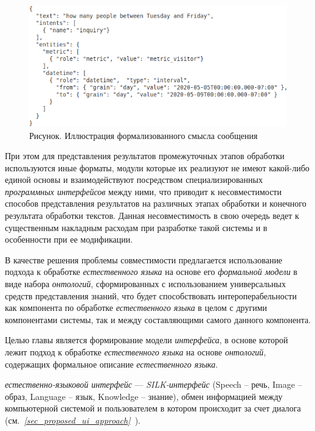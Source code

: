 \begin{figure}[H]
    \caption{Рисунок. Иллюстрация формализованного смысла сообщения}
    \centerline{\includegraphics[scale=0.55]{images/part4/chapter_nl_interfaces/message_intents}}
    \label{fig:message_intents}
\end{figure}

При этом для представления результатов промежуточных этапов обработки используются иные форматы, модули которые их реализуют не имеют какой-либо единой основы и взаимодействуют посредством специализированных \textit{программных интерфейсов} между ними, что приводит к несовместимости способов представления результатов на различных этапах обработки и конечного результата обработки текстов.
Данная несовместимость в свою очередь ведет к существенным накладным расходам при разработке такой системы и в особенности при ее модификации.

В качестве решения проблемы совместимости предлагается использование подхода к обработке \textit{естественного языка} на основе его \textit{формальной модели} в виде набора \textit{онтологий}, сформированных с использованием универсальных средств представления знаний, что будет способствовать интероперабельности как компонента по обработке \textit{естественного языка} в целом с другими компонентами системы, так и между составляющими самого данного компонента.

Целью главы является формирование модели \textit{интерфейса}, в основе которой лежит подход к обработке \textit{естественного языка} на основе \textit{онтологий}, содержащих формальное описание \textit{естественного языка}.

\textit{естественно-языковой интерфейс} --- \textit{SILK-интерфейс} (Speech – речь, Image – образ, Language – язык, Knowledge – знание), обмен информацией между компьютерной системой и пользователем в котором происходит за счет диалога (см.~\textit{\ref{sec_proposed_ui_approach}~}).

